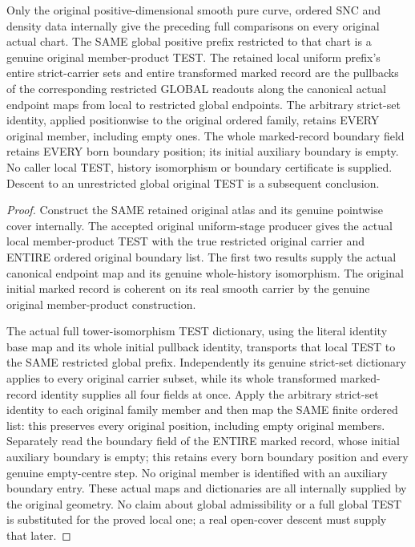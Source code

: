 \begin{theorem}
\label{hir:sharp-actual-curve-original-global-prefix-local-test-readouts}
\leanok
Only the original positive-dimensional smooth pure curve, ordered SNC and
density data internally give the preceding full comparisons on every
original actual chart. The SAME global positive prefix restricted to that
chart is a genuine original member-product TEST. The retained local uniform prefix's entire strict-carrier sets and entire
transformed marked record are the pullbacks of the corresponding restricted
GLOBAL readouts along the canonical actual endpoint maps from local to
restricted global endpoints. The arbitrary strict-set identity, applied
positionwise to the original ordered family, retains EVERY original member,
including empty ones. The whole marked-record boundary field retains EVERY
born boundary position; its initial auxiliary boundary is empty. No caller local
TEST, history isomorphism or boundary certificate is supplied. Descent to
an unrestricted global original TEST is a subsequent conclusion.
\end{theorem}
\begin{proof}
Construct the SAME retained original atlas and its genuine pointwise cover
internally. The accepted original uniform-stage producer gives the actual
local member-product TEST with the true restricted original carrier and
ENTIRE ordered original boundary list. The first two results supply the
actual canonical endpoint map and its genuine whole-history isomorphism.
The original initial marked record is coherent on its real smooth carrier
by the genuine original member-product construction.

The actual full tower-isomorphism TEST dictionary, using the literal
identity base map and its whole initial pullback identity, transports that
local TEST to the SAME restricted global prefix. Independently its genuine
strict-set dictionary applies to every original carrier subset, while its
whole transformed marked-record identity supplies all four fields at once.
Apply the arbitrary strict-set identity to each original family member and
then map the SAME finite ordered list: this preserves every original
position, including empty original members. Separately read the boundary
field of the ENTIRE marked record, whose initial auxiliary boundary is
empty; this retains every born boundary position and every genuine
empty-centre step. No original member is identified with an auxiliary
boundary entry. These actual maps
and dictionaries are all internally supplied by the original geometry.
No claim about global admissibility or a full global TEST is substituted
for the proved local one; a real open-cover descent must supply that later.
\end{proof}
